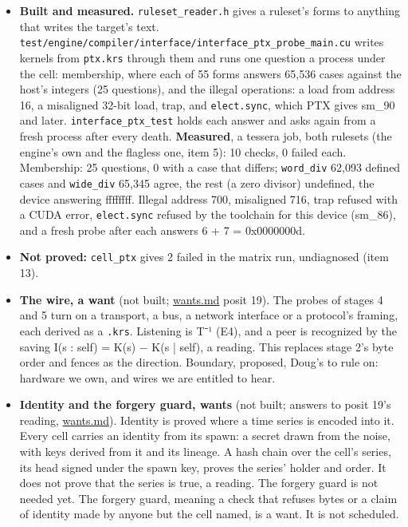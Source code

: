 \begin{enumerate}
\begin{itemize}
\begin{enumerate}
\begin{itemize}
\item \textbf{Built and measured.} \texttt{ruleset\_\allowbreak{}reader.\allowbreak{}h} gives a ruleset's forms to anything that writes the target's text. \texttt{test/\allowbreak{}engine/\allowbreak{}compiler/\allowbreak{}interface/\allowbreak{}interface\_\allowbreak{}ptx\_\allowbreak{}probe\_\allowbreak{}main.\allowbreak{}cu} writes kernels from \texttt{ptx.\allowbreak{}krs} through them and runs one question a process under the cell: membership, where each of 55 forms answers 65,536 cases against the host's integers (25 questions), and the illegal operations: a load from address 16, a misaligned 32-bit load, trap, and \texttt{elect.\allowbreak{}sync}, which PTX gives sm\_\allowbreak{}90 and later. \texttt{interface\_\allowbreak{}ptx\_\allowbreak{}test} holds each answer and asks again from a fresh process after every death. \textbf{Measured}, a tessera job, both rulesets (the engine's own and the flagless one, item 5): 10 checks, 0 failed each. Membership: 25 questions, 0 with a case that differs; \texttt{word\_\allowbreak{}div} 62,093 defined cases and \texttt{wide\_\allowbreak{}div} 65,345 agree, the rest (a zero divisor) undefined, the device answering ffffffff. Illegal address 700, misaligned 716, trap refused with a CUDA error, \texttt{elect.\allowbreak{}sync} refused by the toolchain for this device (sm\_\allowbreak{}86), and a fresh probe after each answers 6 + 7 = 0x0000000d.
\item \textbf{Not proved:} \texttt{cell\_\allowbreak{}ptx} gives 2 failed in the matrix run, undiagnosed (item 13).
\item \textbf{The wire, a want} (not built; \hyperref[chap:wants]{wants.md} posit 19). The probes of stages 4 and 5 turn on a transport, a bus, a network interface or a protocol's framing, each derived as a \texttt{.\allowbreak{}krs}. Listening is T⁻¹ (E4), and a peer is recognized by the saving I(s : self) = K(s) − K(s | self), a reading. This replaces stage 2's byte order and fences as the direction. Boundary, proposed, Doug's to rule on: hardware we own, and wires we are entitled to hear.
\item \textbf{Identity and the forgery guard, wants} (not built; answers to posit 19's reading, \hyperref[chap:wants]{wants.md}). Identity is proved where a time series is encoded into it. Every cell carries an identity from its spawn: a secret drawn from the noise, with keys derived from it and its lineage. A hash chain over the cell's series, its head signed under the spawn key, proves the series' holder and order. It does not prove that the series is true, a reading. The forgery guard is not needed yet. The forgery guard, meaning a check that refuses bytes or a claim of identity made by anyone but the cell named, is a want. It is not scheduled.

\end{itemize}
\end{enumerate}
\end{itemize}
\end{enumerate}
